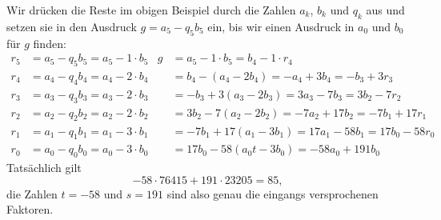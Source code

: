 \begin{beispiel}
Wir drücken die Reste im obigen Beispiel durch die Zahlen $a_k$, $b_k$ und
$q_k$ aus und setzen sie in den Ausdruck $g=a_5-q_5b_5$ ein, bis wir
einen Ausdruck in $a_0$ und $b_0$ für $g$ finden:
\begin{align*}
r_5&=a_5-q_5 b_5=a_5-1\cdot b_5& g &= a_5 - 1 \cdot b_5 = b_4 - 1 \cdot r_4
\\
r_4&=a_4-q_4 b_4=a_4-2\cdot b_4&   &= b_4 - (a_4 -2b_4) 
                                    = -a_4 +3b_4 = -b_3 + 3r_3
\\
r_3&=a_3-q_3 b_3=a_3-2\cdot b_3&   &= -b_3 + 3(a_3-2b_3)
                                    = 3a_3 - 7b_3 = 3b_2 -7r_2
\\
r_2&=a_2-q_2 b_2=a_2-2\cdot b_2&   &= 3b_2 -7(a_2-2b_2)
                                    = -7a_2 + 17b_2 = -7b_1 + 17r_1
\\
r_1&=a_1-q_1 b_1=a_1-3\cdot b_1&   &= -7b_1 + 17(a_1-3b_1)
                                    = 17a_1 - 58b_1 = 17 b_0 - 58 r_0
\\
r_0&=a_0-q_0 b_0=a_0-3\cdot b_0&   &= 17b_0 - 58(a_0t-3b_0)
                                    = -58a_0+191b_0
\end{align*}
Tatsächlich gilt
\[
-58\cdot 76415 + 191 \cdot 23205 = 85,
\]
die Zahlen $t=-58$ und $s=191$ sind also genau die eingangs versprochenen
Faktoren.
\end{beispiel}

%
%
